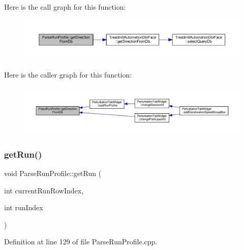 Here is the call graph for this function\+:
\nopagebreak
\begin{figure}[H]
\begin{center}
\leavevmode
\includegraphics[width=350pt]{class_parse_run_profile_a314fabde62110ee4da32de14e5b5c607_cgraph}
\end{center}
\end{figure}
Here is the caller graph for this function\+:
\nopagebreak
\begin{figure}[H]
\begin{center}
\leavevmode
\includegraphics[width=350pt]{class_parse_run_profile_a314fabde62110ee4da32de14e5b5c607_icgraph}
\end{center}
\end{figure}
\mbox{\label{class_parse_run_profile_a1f064521af699320f5da111e9cb81625}} 
\subsubsection{\texorpdfstring{get\+Run()}{getRun()}}
{\footnotesize\ttfamily void Parse\+Run\+Profile\+::get\+Run (\begin{DoxyParamCaption}\item[{int}]{current\+Run\+Row\+Index,  }\item[{int}]{run\+Index }\end{DoxyParamCaption})}



Definition at line 129 of file Parse\+Run\+Profile.\+cpp.

